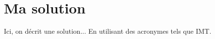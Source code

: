 \chapter{Ma solution}

Ici, on décrit une solution... En utilisant des acronymes tels que
\gls{IMT}.

